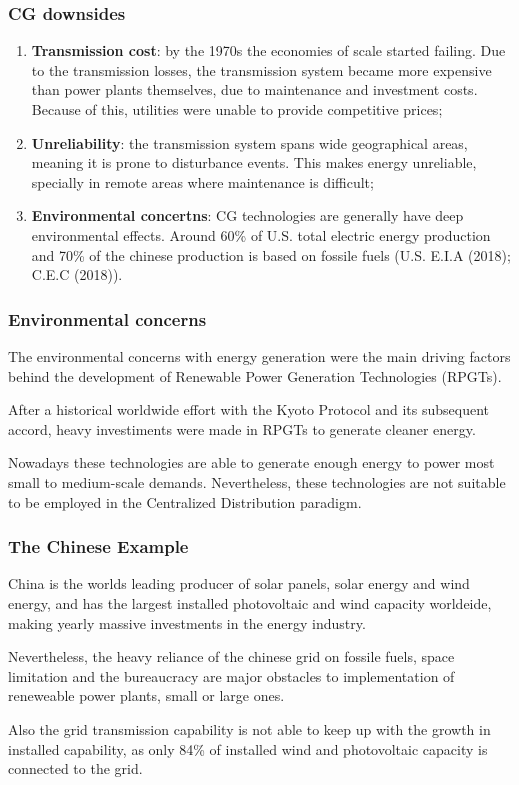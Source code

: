 \documentclass[10pt, compress,xcolor={svgnames,dvipsnames,x11names}]{beamer}
\begin{document}
\begin{frame}%
\frametitle{CG downsides}

\begin{enumerate}[<+->]
	\item \textbf{Transmission cost}: by the 1970s the economies of scale started failing. Due to the transmission losses, the transmission system became more expensive than power plants themselves, due to maintenance and investment costs.  Because of this, utilities were unable to provide competitive prices;
%
	\item \textbf{Unreliability}: the transmission system spans wide geographical areas, meaning it is prone to disturbance events. This makes energy unreliable, specially in remote areas where maintenance is difficult;
%
	\item \textbf{Environmental concertns}: CG technologies are generally have deep environmental effects. Around 60\% of U.S. total electric energy production and 70\% of the chinese production is based on fossile fuels (U.S. E.I.A (2018); C.E.C (2018)). 
\end{enumerate}
	
\end{frame}%

\begin{frame}%
\frametitle{Environmental concerns}

	The environmental concerns with energy generation were the main driving factors behind the development of Renewable Power Generation Technologies (RPGTs).

	After a historical worldwide effort with the Kyoto Protocol and its subsequent accord, heavy investiments were made in RPGTs to generate cleaner energy.

	Nowadays these technologies are able to generate enough energy to power most small to medium-scale demands. Nevertheless, these technologies are not suitable to be employed in the Centralized Distribution paradigm.
	
\end{frame}%

\begin{frame}%
\frametitle{The Chinese Example}

	China is the worlds leading producer of solar panels, solar energy and wind energy, and has the largest installed photovoltaic and wind capacity worldeide, making yearly massive investments in the energy industry.

	Nevertheless, the heavy reliance of the chinese grid on fossile fuels, space limitation and the bureaucracy are major obstacles to implementation of reneweable power plants, small or large ones.

	Also the grid transmission capability is not able to keep up with the growth in installed capability, as only 84\% of installed wind and photovoltaic capacity is connected to the grid.
	
\end{frame}%
\end{document}
